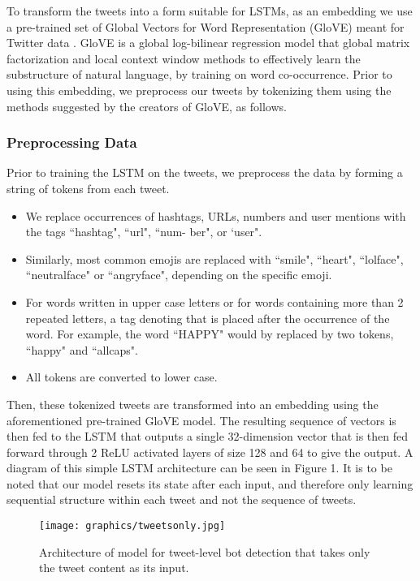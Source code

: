 To transform the tweets into a form suitable for LSTMs, as an embedding we use a pre-trained set of Global Vectors for Word Representation (GloVE) meant for Twitter data \cite{pennington2014glove}. GloVE is a global log-bilinear regression model that global matrix factorization and local context window methods to effectively learn the substructure of natural language, by training on word co-occurrence.  Prior to using this embedding, we  preprocess our tweets by tokenizing them using the methods suggested by the creators of GloVE, as follows.

\subsubsection{Preprocessing Data}

Prior to training the LSTM on the tweets, we preprocess the data by forming a string of tokens from each tweet.
	\begin{itemize}
	\item We replace occurrences of hashtags, URLs, numbers and user mentions with the tags ``hashtag", ``url", ``num- ber", or `user".
    \item Similarly, most common emojis are replaced with ``smile", ``heart",  ``lolface", ``neutralface" or ``angryface", depending on the specific emoji.  
    \item For words written in upper case letters or for words containing more than 2 repeated letters, a tag denoting that is placed after the occurrence of the word. For example, the word ``HAPPY" would by replaced by two tokens, ``happy" and ``allcaps". 
    \item All tokens are converted to lower case. 
	\end{itemize}

Then, these tokenized tweets are  transformed into an embedding using the aforementioned pre-trained GloVE model. The resulting sequence of vectors is then fed to the LSTM that outputs a single 32-dimension vector that is then fed forward through 2 ReLU activated layers of size 128 and 64 to give the output. A diagram of this simple LSTM architecture can be seen in Figure 1. It is to be noted that our model resets its state after each input, and therefore only learning sequential structure within each tweet and not the sequence of tweets.  \par

\begin{figure}
\begin{center}
\texttt{[image: graphics/tweetsonly.jpg]} 
\caption{Architecture of model for tweet-level bot detection that takes only the tweet content as its input.}
\end{center}\vspace*{-.6cm}
\end{figure}


